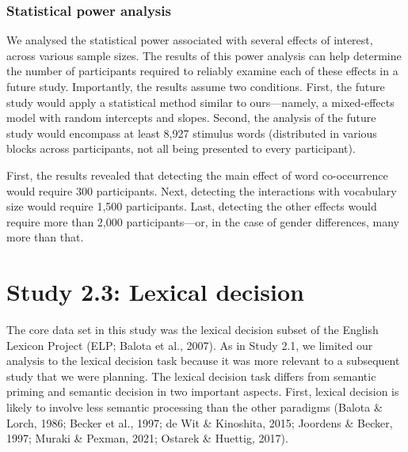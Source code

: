 \documentclass[
  12pt,
  man,floatsintext]{apa7}
\begin{document}
\hypertarget{statistical-power-analysis-5}{%
\subsubsection{Statistical power analysis}\label{statistical-power-analysis-5}}

We analysed the statistical power associated with several effects of interest, across various sample sizes. The results of this power analysis can help determine the number of participants required to reliably examine each of these effects in a future study. Importantly, the results assume two conditions. First, the future study would apply a statistical method similar to ours---namely, a mixed-effects model with random intercepts and slopes. Second, the analysis of the future study would encompass at least 8,927 stimulus words (distributed in various blocks across participants, not all being presented to every participant).

First, the results revealed that detecting the main effect of word co-occurrence would require 300 participants. Next, detecting the interactions with vocabulary size would require 1,500 participants. Last, detecting the other effects would require more than 2,000 participants---or, in the case of gender differences, many more than that.

\clearpage

\hypertarget{lexicaldecision}{%
\section{Study 2.3: Lexical decision}\label{lexicaldecision}}

The core data set in this study was the lexical decision subset of the English Lexicon Project (ELP; Balota et al., 2007). As in Study 2.1, we limited our analysis to the lexical decision task because it was more relevant to a subsequent study that we were planning. The lexical decision task differs from semantic priming and semantic decision in two important aspects. First, lexical decision is likely to involve less semantic processing than the other paradigms (Balota \& Lorch, 1986; Becker et al., 1997; de Wit \& Kinoshita, 2015; Joordens \& Becker, 1997; Muraki \& Pexman, 2021; Ostarek \& Huettig, 2017).
\end{document}
